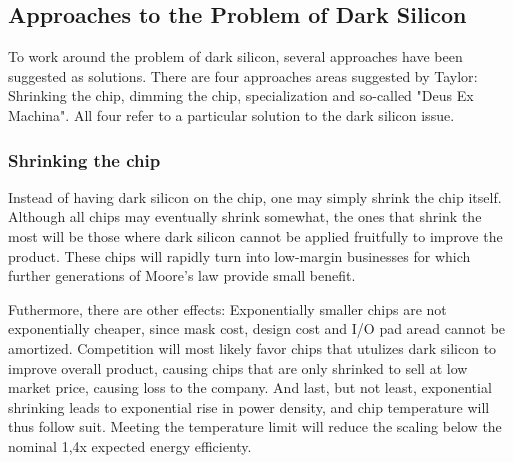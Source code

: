 \subsection{Approaches to the Problem of Dark Silicon}
To work around the problem of dark silicon, several approaches have been suggested as solutions.
There are four approaches areas suggested by Taylor\cite{dark-silicon}: Shrinking the chip, dimming the chip, specialization and so-called "Deus Ex Machina".
All four refer to a particular solution to the dark silicon issue.



\subsubsection{Shrinking the chip}

Instead of having dark silicon on the chip, one may simply shrink the chip itself.
Although all chips may eventually shrink somewhat, the ones that shrink the most will be those where dark silicon cannot be applied fruitfully to improve the product.
These chips will rapidly turn into low-margin businesses for which further generations of Moore’s law provide small benefit.

Futhermore, there are other effects: Exponentially smaller chips are not exponentially cheaper, since mask cost, design cost and I/O pad aread cannot be amortized. 
Competition will most likely favor chips that utulizes dark silicon to improve overall product, causing chips that are only shrinked to sell at low market price, causing loss to the company.
And last, but not least, exponential shrinking leads to exponential rise in power density, and chip temperature will thus follow suit.
Meeting the temperature limit will reduce the scaling below the nominal 1,4x expected energy efficienty. \cite{dark-silicon}

